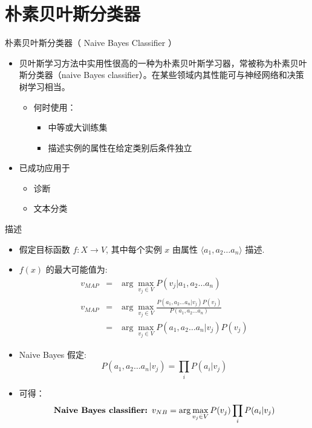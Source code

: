 \documentclass[presentation]{beamer}
\begin{document}
\section{朴素贝叶斯分类器}
\label{sec:org057f866}
\begin{frame}[label={sec:org66e9eda}]{朴素贝叶斯分类器（ Naive Bayes Classifier ）}
\begin{itemize}
\item 贝叶斯学习方法中实用性很高的一种为朴素贝叶斯学习器，常被称为朴素贝叶斯分类器（naive Bayes classifier）。在某些领域内其性能可与神经网络和决策树学习相当。
\begin{itemize}
\item 何时使用：
\begin{itemize}
\item 中等或大训练集
\item 描述实例的属性在给定类别后条件独立
\end{itemize}
\end{itemize}
\item 已成功应用于
\begin{itemize}
\item 诊断
\item 文本分类
\end{itemize}
\end{itemize}
\end{frame}
\begin{frame}[label={sec:org7b8cbe6}]{描述}
\begin{itemize}
\item 假定目标函数 \(f: X \rightarrow V\), 其中每个实例 \(x\) 由属性 \(\langle a_{1}, a_{2} \ldots a_{n} \rangle\) 描述.
\item \(f(x)\) 的最大可能值为:
\begin{eqnarray}
v_{MAP} &= &\arg \max_{v_{j} \in V} P(v_{j} | a_{1}, a_{2} \ldots a_{n})  \nonumber \\ 
v_{MAP} &= &\arg \max_{v_{j} \in V} \frac{P(a_{1}, a_{2} \ldots a_{n}|v_{j})
P(v_{j})}{P(a_{1}, a_{2} \ldots a_{n})} \nonumber \\ 
&= &\arg \max_{v_{j} \in V} P(a_{1}, a_{2} \ldots a_{n}|v_{j}) P(v_{j}) \nonumber
\end{eqnarray}
\item Naive Bayes 假定:
\[ P(a_{1}, a_{2} \ldots a_{n}|v_{j}) = \prod_{i} P(a_{i} | v_{j}) \]
\item 可得： 
\[\mbox{\bf Naive Bayes classifier: } v_{NB} = \arg \max_{v_{j} \in V} P(v_{j})\prod_{i} P(a_{i} | v_{j}) \]
\end{itemize}
\end{frame}
\end{document}
